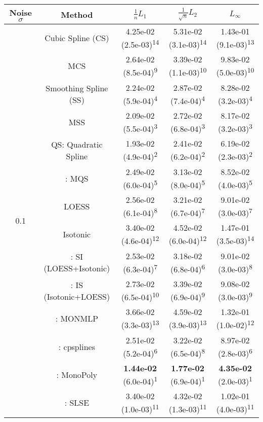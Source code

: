 \begin{tabular}{ccccc}
\toprule
Noise $\sigma$ & Method&$\frac 1n L_1$&$\frac{1}{\sqrt n}L_2$&$L_\infty$\tabularnewline
\midrule
\multirow{14}{*}{0.1}&Cubic Spline (CS)& 4.25e-02 (2.5e-03)\textsuperscript{14}& 5.31e-02 (3.1e-03)\textsuperscript{14}& 1.43e-01 (9.1e-03)\textsuperscript{13}\tabularnewline
&MCS& 2.64e-02 (8.5e-04)\textsuperscript{9}& 3.39e-02 (1.1e-03)\textsuperscript{10}& 9.83e-02 (5.0e-03)\textsuperscript{10}\tabularnewline
&Smoothing Spline (SS)& 2.24e-02 (5.9e-04)\textsuperscript{4}& 2.87e-02 (7.4e-04)\textsuperscript{4}& 8.28e-02 (3.2e-03)\textsuperscript{4}\tabularnewline
&MSS& 2.09e-02 (5.5e-04)\textsuperscript{3}& 2.72e-02 (6.8e-04)\textsuperscript{3}& 8.17e-02 (3.2e-03)\textsuperscript{3}\tabularnewline
&QS: Quadratic Spline& 1.93e-02 (4.9e-04)\textsuperscript{2}& 2.41e-02 (6.2e-04)\textsuperscript{2}& 6.19e-02 (2.3e-03)\textsuperscript{2}\tabularnewline
&\textcite{heMonotoneBsplineSmoothing1998}: MQS& 2.49e-02 (6.0e-04)\textsuperscript{5}& 3.13e-02 (8.0e-04)\textsuperscript{5}& 8.52e-02 (4.0e-03)\textsuperscript{5}\tabularnewline
&LOESS& 2.56e-02 (6.1e-04)\textsuperscript{8}& 3.21e-02 (6.7e-04)\textsuperscript{7}& 9.01e-02 (3.0e-03)\textsuperscript{7}\tabularnewline
&Isotonic& 3.40e-02 (4.6e-04)\textsuperscript{12}& 4.52e-02 (6.0e-04)\textsuperscript{12}& 1.47e-01 (3.5e-03)\textsuperscript{14}\tabularnewline
&\textcite{mammenEstimatingSmoothMonotone1991}: SI (LOESS+Isotonic)& 2.53e-02 (6.3e-04)\textsuperscript{7}& 3.18e-02 (6.8e-04)\textsuperscript{6}& 9.01e-02 (3.0e-03)\textsuperscript{8}\tabularnewline
&\textcite{mammenEstimatingSmoothMonotone1991}: IS (Isotonic+LOESS)& 2.73e-02 (6.5e-04)\textsuperscript{10}& 3.39e-02 (6.9e-04)\textsuperscript{9}& 9.08e-02 (3.0e-03)\textsuperscript{9}\tabularnewline
&\textcite{cannonMonmlpMultilayerPerceptron2017}: MONMLP& 3.66e-02 (3.3e-03)\textsuperscript{13}& 4.59e-02 (3.9e-03)\textsuperscript{13}& 1.32e-01 (1.0e-02)\textsuperscript{12}\tabularnewline
&\textcite{navarro-garciaConstrainedSmoothingOutofrange2023}: cpsplines& 2.51e-02 (5.2e-04)\textsuperscript{6}& 3.22e-02 (6.5e-04)\textsuperscript{8}& 8.97e-02 (2.8e-03)\textsuperscript{6}\tabularnewline
&\textcite{murrayFastFlexibleMethods2016a}: MonoPoly& \textbf{1.44e-02} (6.0e-04)\textsuperscript{1}& \textbf{1.77e-02} (6.9e-04)\textsuperscript{1}& \textbf{4.35e-02} (2.0e-03)\textsuperscript{1}\tabularnewline
&\textcite{groeneboomConfidenceIntervalsMonotone2023}: SLSE& 3.40e-02 (1.0e-03)\textsuperscript{11}& 4.32e-02 (1.3e-03)\textsuperscript{11}& 1.02e-01 (4.0e-03)\textsuperscript{11}\tabularnewline
\midrule

\end{tabular}
